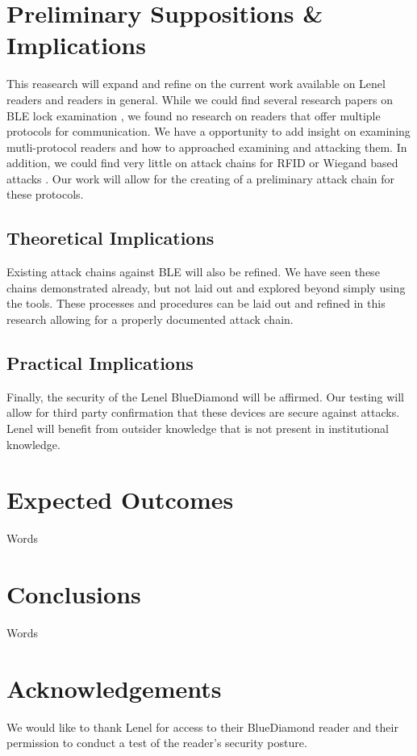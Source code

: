 \documentclass[10pt,twocolumn,letterpaper]{article}
\begin{document}
\section{Preliminary Suppositions \& Implications}
This reasearch will expand and refine on the current work available on Lenel readers and readers in general. While we could find several research papers on BLE lock examination \cite{matthewrs2017surveydoorlock}\cite{ho2016smart}\cite{ye2017security}\cite{8887393}, we found no research on readers that offer multiple protocols for communication. We have a opportunity to add insight on examining mutli-protocol readers and how to approached examining and attacking them. In addition, we could find very little on attack chains for RFID or Wiegand based attacks \cite{chung2017wiegand}. Our work will allow for the creating of a preliminary attack chain for these protocols.

\subsection{Theoretical Implications}
Existing attack chains against BLE will also be refined. We have seen these chains demonstrated \cite{lonzetta2018security}\cite{BluetoothMITMTal} already, but not laid out and explored beyond simply using the tools. These processes and procedures can be laid out and refined in this research allowing for a properly documented attack chain.

\subsection{Practical Implications}
Finally, the security of the Lenel BlueDiamond will be affirmed. Our testing will allow for third party confirmation that these devices are secure against attacks. Lenel will benefit from outsider knowledge that is not present in institutional knowledge.

\section{Expected Outcomes}
Words

\section{Conclusions}
Words

\section{Acknowledgements}
We would like to thank Lenel for access to their BlueDiamond reader and their permission to conduct a test of the reader's security posture.



\end{document}
